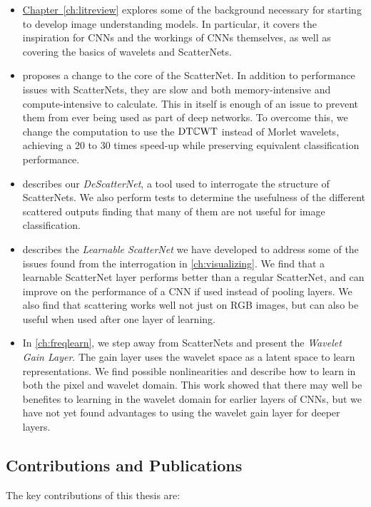 \begin{itemize}
\item
  \hyperref[ch:litreview]{Chapter~\ref*{ch:litreview}} 
  explores some of the background necessary for starting
  to develop image understanding models. In particular, it covers the
  inspiration for CNNs and the workings of CNNs themselves, as well as covering
  the basics of wavelets and ScatterNets.
\item 
   proposes a change to the core of the ScatterNet. In
  addition to performance issues with ScatterNets, they are slow and both
  memory-intensive and compute-intensive to calculate. This in itself is enough of an
  issue to prevent them from ever being used as part of deep networks. To
  overcome this, we change the computation to use the $\mathrm{DT}\mathbb{C}\mathrm{WT}$
  \cite{selesnick_dual-tree_2005} instead of Morlet wavelets, achieving a 20 to
  30 times speed-up while preserving equivalent classification performance.
\item 
   describes our \emph{DeScatterNet}, a tool used to
  interrogate the structure of ScatterNets. We also perform tests to determine
  the usefulness of the different scattered outputs finding that many of them
  are not useful for image classification.
\item 
   describes the \emph{Learnable ScatterNet} we have developed to 
  address some of the issues found from the interrogation in
  \autoref{ch:visualizing}. We find that a learnable ScatterNet layer performs
  better than a regular ScatterNet, and can improve on the performance of a CNN 
  if used instead of pooling layers. We also find that scattering works well not
  just on RGB images, but can also be useful when used after one layer of
  learning.
\item
  In \autoref{ch:freqlearn}, we step away from ScatterNets and present the
  \emph{Wavelet Gain Layer}. The gain layer uses 
  the wavelet space as a latent space to learn representations. We find possible
  nonlinearities and describe how to learn in both the pixel and wavelet domain.
  This work showed that there may well be benefites to learning in the wavelet
  domain for earlier layers of CNNs, but we have not yet found advantages to
  using the wavelet gain layer for deeper layers.
\end{itemize}

\subsection{Contributions and Publications}
The key contributions of this thesis are:

